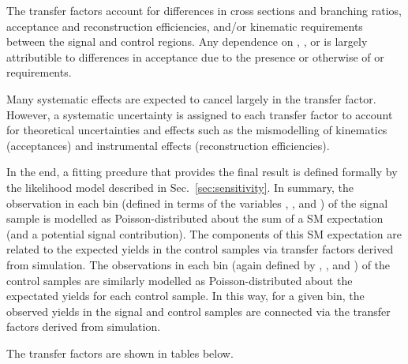 The transfer factors account for differences in cross sections and
branching ratios, acceptance and reconstruction efficiencies, and/or
kinematic requirements between the signal and control regions. Any
dependence on \njet, \nb, or \HT is largely attributible to
differences in acceptance due to the presence or otherwise of \alphat
or \mht requirements.

Many systematic effects are expected to cancel largely in the transfer
factor. However, a systematic uncertainty is assigned to each transfer
factor to account for theoretical uncertainties and effects such as
the mismodelling of kinematics (\eg acceptances) and instrumental
effects (\eg reconstruction efficiencies).

In the end, a fitting prcedure that provides the final result is
defined formally by the likelihood model described in
Sec.~\ref{sec:sensitivity}. In summary, the observation in each bin
(defined in terms of the variables \njet, \nb, and \scalht) of the
signal sample is modelled as Poisson-distributed about the sum of a SM
expectation (and a potential signal contribution). The components of
this SM expectation are related to the expected yields in the control
samples via transfer factors derived from simulation. The observations
in each bin (again defined by \njet, \nb, and \scalht) of the control
samples are similarly modelled as Poisson-distributed about the
expectated yields for each control sample. In this way, for a given
bin, the observed yields in the signal and control samples are
connected via the transfer factors derived from simulation. 



The transfer factors are shown in tables below.

